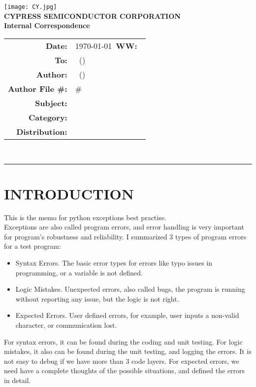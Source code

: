 \documentclass{article}
\renewcommand{\maketitle}
{
    \begin{center}
    \texttt{[image: CY.jpg]}\\
    \vspace{5 mm}
    \large
    {
    \textbf{CYPRESS SEMICONDUCTOR CORPORATION}\\
    \textbf{Internal Correspondence}\\
    }
    \vspace{1 mm}
    \hspace{0.5 in}
    \begin{tabular}{rl}
    \bf Date: & \today\ \hspace{2 in}\textbf{WW:\ }\WorkWeek\\
    \bf To: & \BossName\ (\BossInitials)\\
    \bf Author: & \Author\ (\AuthorInitials)\\
    \bf Author File \#: & \AuthorInitials\#\MemoNumber\\
    \bf Subject: & \Subject\\
    \bf Category: & \Category\\
    \bf Distribution: & \Distribution\\
    \end{tabular}
    \vspace{3 mm}\\
    \hrule
    \end{center}
    
    \thispagestyle{firstpage}
    \pagestyle{normalpage}
}
\begin{document}
\maketitle

\section{INTRODUCTION}
This is the memo for python exceptions best practise. \\
Exceptions are also called program errors, and error handling is very important for program's robustness and reliability.
I summarized 3 types of program errors for a test program:
\begin{itemize}
    \item
    Syntax Errors. The basic error types for errors like typo issues in programming, or a variable is not defined.
    \item
    Logic Mistakes. Unexpected errors, also called bugs, the program is running without reporting any issue, but the logic is not right. 
    \item
    Expected Errors. User defined errors, for example, user inputs a non-valid character, or communication lost.
\end{itemize}
For syntax errors, it can be found during the coding and unit testing. 
For logic mistakes, it also can be found during the unit testing, and logging the errors. It is not easy to debug if we have more than 3 code layers. 
For expected errors, we need have a complete thoughts of the possible situations, and defined the errors in detail.

\newpage
\end{document}
